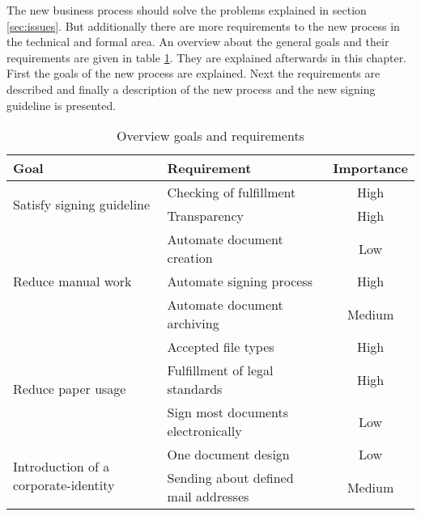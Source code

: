 The new business process should solve the problems explained in section \ref{sec:issues}. But additionally there are more requirements to the new process in the technical and formal area. An overview about the general goals and their requirements are given in table \ref{tab:overviewTargets}. They are explained afterwards in this chapter. First the goals of the new process are explained. Next the requirements are described and finally a description of the new process and the new signing guideline is presented. 

\begin{table}[h!]
	\begin{tabular}{|l|l|c|} \hline
		\rowcolor{Gray}Goal & Requirement & Importance \\ \hline
		\multirow{2}{*}{Satisfy signing guideline} & Checking of fulfillment & High \\ \cline{2-3}
		& Transparency & High \\ \hline
		\multirow{3}{*}{Reduce manual work} & Automate document creation & Low \\ \cline{2-3}
		& Automate signing process & High \\ \cline{2-3}
		& Automate document archiving & Medium \\ \hline
		\multirow{3}{*}{Reduce paper usage} & Accepted file types & High \\ \cline{2-3}
		& Fulfillment of legal standards & High \\ \cline{2-3}
		& Sign most documents electronically & Low \\ \hline
		\multirow{2}{*}{Introduction of a corporate-identity} & One document design & Low \\ \cline{2-3}
		& Sending about defined mail addresses & Medium \\ \hline
	\end{tabular}
	\centering
	\caption{Overview goals and requirements}
	\label{tab:overviewTargets}
\end{table}


